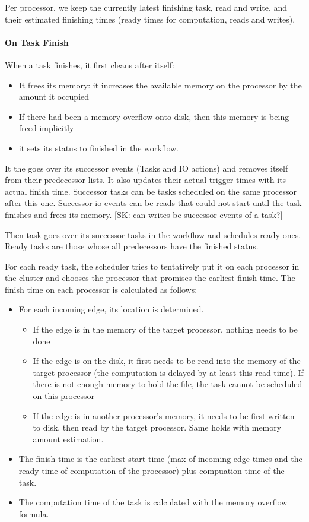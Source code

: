 \documentclass[conference]{IEEEtran}
\newcommand{\skug}[1]{{\color{blue}[SK: #1]}}
\begin{document}
    Per processor, we keep the currently latest finishing task, read and write, and their estimated finishing times (ready times
    for computation, reads and writes).


    \paragraph{On Task Finish}
    When a task finishes, it first cleans after itself:
    \begin{itemize}
        \item It frees its memory: it increases the available memory on the processor by the amount it occupied
        \item If there had been a memory overflow onto disk, then this memory is being freed implicitly
        \item it sets its status to finished in the workflow.
    \end{itemize}
    It the goes over its successor events (Tasks and IO actions) and removes itself from their predecessor lists.
    It also updates their actual trigger times with its actual finish time.
    Successor tasks can be tasks scheduled on the same processor after this one.
    Successor io events can be reads that could not start until the task finishes and frees its memory.
    \skug{can writes be successor events of a task?}

    Then task goes over its successor tasks in the workflow and schedules ready ones.
    Ready tasks are those whose all predecessors have the finished status.

    For each ready task, the scheduler tries to tentatively put it on each processor in the cluster and chooses the processor
    that promises the earliest finish time.
    The finish time on each processor is calculated as follows:

    \begin{itemize}
        \item For each incoming edge, its location is determined.
        \begin{itemize}
                 \item If the edge is in the memory of the target processor, nothing needs to be done
                  \item If the edge is on the disk, it first needs to be read into the memory of the target processor (the computation is delayed by at least this read time).
                 If there is not enough memory to hold the file, the task cannot be scheduled on this processor
                  \item If the edge is in another processor's memory, it needs to be first written to disk, then read by the target processor. Same holds with memory amount estimation.
        \end{itemize}
        \item The finish time is the earliest start time (max of incoming edge times and the ready time of computation of the processor) plus compuation time of the task.
        \item The computation time of the task is calculated with the memory overflow formula.
    \end{itemize}
\end{document}
